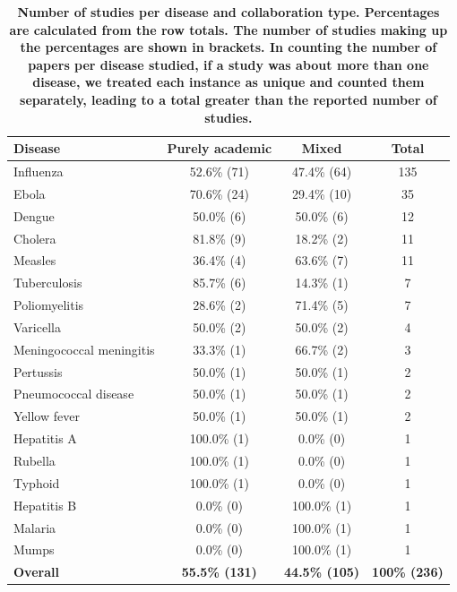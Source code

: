 \documentclass[10pt,letterpaper]{article}
\begin{document}
\begin{table}[!h]
		\setlength\arrayrulewidth{1pt} 
	\centering
	\caption{\bf Number of studies per disease and collaboration type. Percentages are calculated from the row totals. The number of studies making up the percentages are shown in brackets. In counting the number of papers per disease studied, if a study was about more than one disease, we treated each instance as unique and counted them separately, leading to a total greater than the reported number of studies.}
	\label{chap3-table: Number of studies per disease and collaboration type}
	\begin{tabular}{|l c c c|}
		\hline
		\textbf{Disease}         & \textbf{Purely academic} & \textbf{Mixed} & \textbf{Total} \\ \hline
		Influenza                & 52.6\% (71)     & 47.4\% (64) & 135   \\ \hline
		Ebola                    & 70.6\% (24)     & 29.4\% (10) & 35    \\ \hline
		Dengue                   & 50.0\% (6)      & 50.0\% (6)  & 12    \\ \hline
		Cholera                  & 81.8\% (9)      & 18.2\% (2)  & 11    \\ \hline
		Measles                  & 36.4\% (4)      & 63.6\% (7)  & 11    \\ \hline
		Tuberculosis             & 85.7\% (6)      & 14.3\% (1)  & 7     \\ \hline
		Poliomyelitis            & 28.6\% (2)      & 71.4\% (5)  & 7     \\ \hline
		Varicella                & 50.0\% (2)      & 50.0\% (2)  & 4     \\ \hline
		Meningococcal meningitis & 33.3\% (1)      & 66.7\% (2)  & 3     \\ \hline
		Pertussis                & 50.0\% (1)      & 50.0\% (1)  & 2     \\ \hline
		Pneumococcal disease     & 50.0\% (1)      & 50.0\% (1)  & 2     \\ \hline
		Yellow fever             & 50.0\% (1)      & 50.0\% (1)  & 2     \\ \hline
		Hepatitis A             & 100.0\% (1)     & 0.0\% (0)   & 1     \\ \hline
		Rubella                  & 100.0\% (1)     & 0.0\% (0)   & 1     \\ \hline
		Typhoid                  & 100.0\% (1)     & 0.0\% (0)   & 1     \\ \hline
		Hepatitis B              & 0.0\% (0)       & 100.0\% (1) & 1     \\ \hline
		Malaria                  & 0.0\% (0)       & 100.0\% (1) & 1     \\ \hline
		Mumps                    & 0.0\% (0)       & 100.0\% (1) & 1    \\ \hline \rowcolor{gray!20}
		\textbf{Overall}			&	\textbf{55.5\% (131)}   			& \textbf{44.5\% (105)}   & \textbf{100\% (236)} \\
		\hline
	\end{tabular}
	\label{studies_per_disease_and_collaboration_type}
\end{table}
\end{document}

